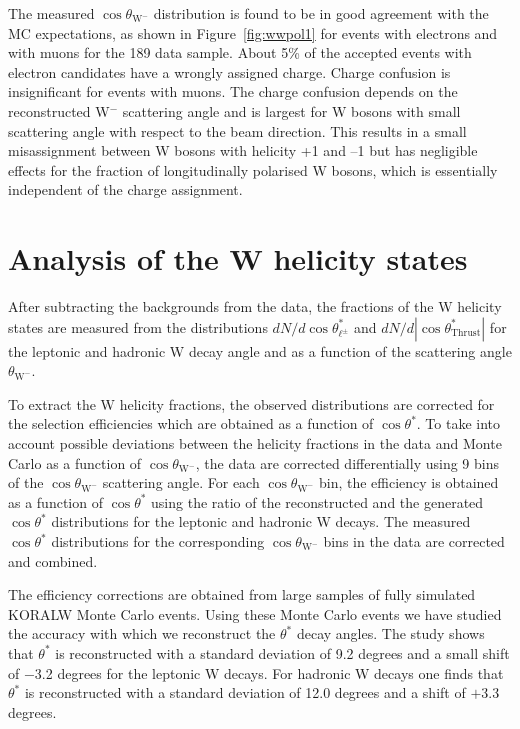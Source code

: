\documentclass[12pt,a4paper,dvips]{article}
\begin{document}
The measured $\cos \theta_{\mathrm{W}^{-}}$ distribution
is found to be in good agreement with the MC expectations, 
as shown in Figure~\ref{fig:wwpol1} for events with electrons and 
with muons for the 189 \GeV{} data sample.
About 5\% of the accepted events with 
electron candidates have a wrongly assigned charge. Charge confusion is
insignificant for events with muons. 
The charge confusion depends on the reconstructed W$^{-}$ 
scattering angle and is largest for W bosons with small scattering 
angle with respect to the beam direction. This results in a 
small misassignment between W bosons with helicity +1 and --1 but has 
negligible effects for the fraction of longitudinally 
polarised W bosons, which is essentially independent of 
the charge assignment.  


\section*{Analysis of the W helicity states}
%
After subtracting the backgrounds from the data, 
the fractions of the W helicity states are measured 
from the distributions $dN/d\cos \theta^{*}_{\ell^{\pm}}$ 
and $dN/ d|\cos \theta^{*}_{\mathrm{Thrust}}|$  for the leptonic 
and hadronic W decay angle and 
as a function of the scattering angle $\theta_{\mathrm{W}^{-}}$.

To extract the W helicity fractions, 
the observed distributions   
are corrected for the selection 
efficiencies which are obtained as a function of $\cos \theta^{*}$.
To take into account possible deviations between 
the helicity fractions in the data and Monte Carlo as a function 
of $\cos \theta_{\mathrm{W}^{-}}$, the 
data are corrected differentially using 9 bins 
of the $\cos \theta_{\mathrm{W}^{-}}$ scattering angle. 
For each $\cos \theta_{\mathrm{W}^{-}}$ bin, the efficiency 
is obtained as a function of $\cos \theta^{*}$ using the 
ratio of the reconstructed and the generated 
$\cos \theta^{*}$ distributions for the leptonic and 
hadronic W decays. The measured $\cos \theta^{*}$ distributions 
for the corresponding $\cos \theta_{\mathrm{W}^{-}}$ bins in the 
data are corrected and combined. 

The efficiency corrections are obtained from large samples of 
fully simulated 
KORALW Monte Carlo events.
Using these Monte Carlo events we have studied
the accuracy with which we reconstruct the $\theta^{*}$ decay angles. 
The study shows that $\theta^{*}$ is reconstructed with a standard 
deviation of 9.2 degrees and a small shift of $-$3.2
degrees for the leptonic W decays. For hadronic W decays 
one finds that $\theta^{*}$ is reconstructed with a standard 
deviation of 12.0 degrees and a shift of $+$3.3 degrees.
\end{document}
